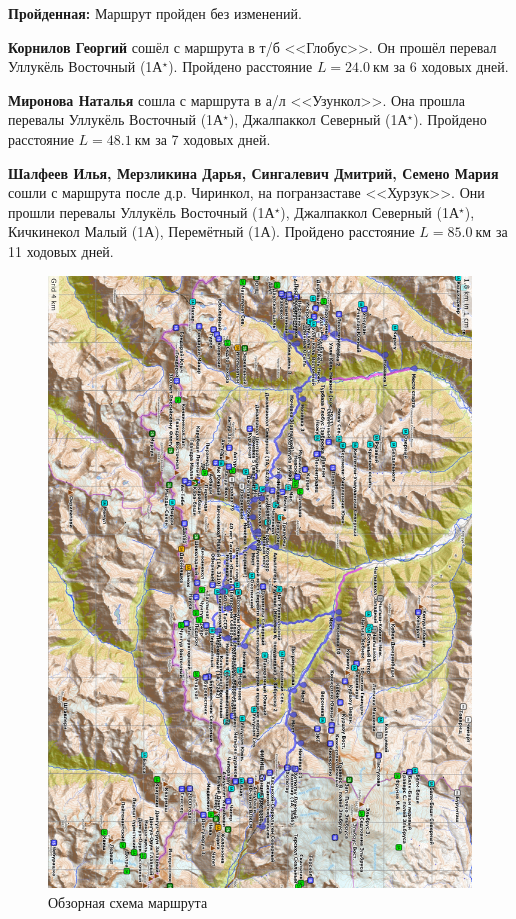 \textbf{Пройденная:} Маршрут пройден без изменений.

\textbf{Корнилов Георгий} сошёл с маршрута в т/б <<Глобус>>. Он прошёл перевал Уллукёль Восточный (1А$^{\star}$). Пройдено расстояние $L=24.0~\text{км}$ за 6 ходовых дней.

\textbf{Миронова Наталья} сошла с маршрута в а/л <<Узункол>>. Она прошла перевалы Уллукёль Восточный (1А$^{\star}$), Джалпаккол Северный (1А$^{\star}$). Пройдено расстояние $L=48.
1~\text{км}$ за 7 ходовых дней.

\textbf{Шалфеев Илья, Мерзликина Дарья, Сингалевич Дмитрий, Семено Мария} сошли с маршрута после д.р. Чиринкол, на погранзаставе <<Хурзук>>. Они прошли перевалы Уллукёль Восточный (1А$^{\star}$), Джалпаккол Северный (1А$^{\star}$), Кичкинекол Малый (1А), Перемётный (1А). Пройдено расстояние $L=85.
0~\text{км}$ за 11 ходовых дней.

\begin{figure}
	\centering
	\includegraphics[width=0.92\linewidth]{../pics/map}
	\caption{Обзорная схема маршрута}
\end{figure}
	
